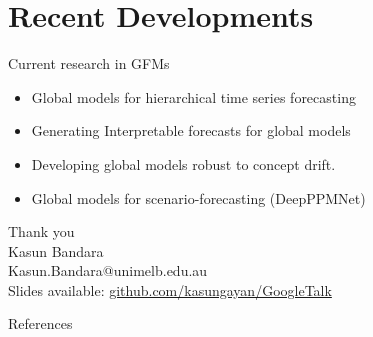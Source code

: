 \documentclass{beamer}
\begin{document}
\section{Recent Developments}


  
 \begin{frame}{Current research in GFMs}
  \begin{itemize}
  		\item Global models for hierarchical time series forecasting 
  		\vspace{2mm}
  		\item Generating Interpretable forecasts for global models
  		\vspace{2mm}
  		\item Developing global models robust to concept drift.
  		\vspace{2mm}
  		\item Global models for scenario-forecasting (DeepPPMNet)
		\end{itemize}
  \end{frame}  


  \begin{frame}
  \begin{center}
  {\Huge Thank you}\vspace{1cm}\\
  Kasun Bandara\vspace{0.2cm}\\
  \textcolor{DiCITSBlue}{Kasun.Bandara@unimelb.edu.au}\vspace{0.8cm}\\
  Slides available: \scriptsize{\url{github.com/kasungayan/GoogleTalk}}
  
  \end{center}
\end{frame}

\begin{frame}[allowframebreaks]{References} 
  \scriptsize


\end{frame}
\end{document}
